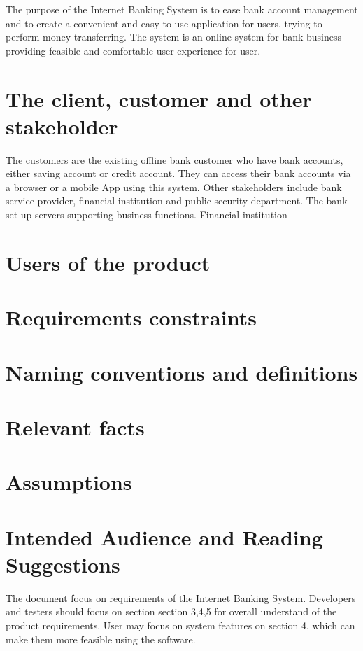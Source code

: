 \documentclass{scrreprt}
\begin{document}
The purpose of the Internet Banking System is to ease bank account management and to create a convenient and easy-to-use application for users, trying to perform money transferring. The system is an online system for bank business providing feasible and comfortable user experience for user.

\section{The client, customer and other stakeholder}
The customers are the existing offline bank customer who have bank accounts, either saving account or credit account. They can access their bank accounts via a browser or a mobile App using this system. Other stakeholders include bank service provider, financial institution and public security department. The bank set up servers supporting business functions. Financial institution 
\section{Users of the product}

\section{Requirements constraints}


\section{Naming conventions and definitions}


\section{Relevant facts}

\section{Assumptions}

\section{Intended Audience and Reading Suggestions}
The document focus on requirements of the Internet Banking System. Developers and testers should focus on section section 3,4,5 for overall understand of the product requirements. User may focus on system features on section 4, which can make them more feasible using the software.
\end{document}
